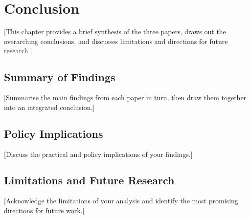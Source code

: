 \chapter{Conclusion}
\label{ch:conclusion}
\resetcounterformats

[This chapter provides a brief synthesis of the three papers, draws out the
overarching conclusions, and discusses limitations and directions for future
research.]

\section{Summary of Findings}
\label{sec:conclusion_summary}

[Summarise the main findings from each paper in turn, then draw them together
into an integrated conclusion.]

\section{Policy Implications}
\label{sec:conclusion_policy}

[Discuss the practical and policy implications of your findings.]

\section{Limitations and Future Research}
\label{sec:conclusion_future}

[Acknowledge the limitations of your analysis and identify the most promising
directions for future work.]

